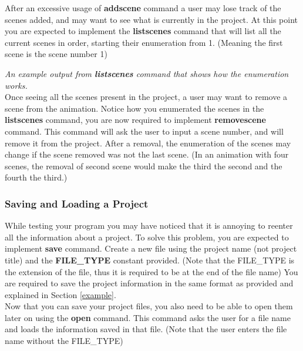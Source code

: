 \documentclass[a4paper]{article}
\begin{document}
	After an excessive usage of \textbf{addscene} command a user may lose track of the scenes added, and may want to see what is currently in the project. At this point you are expected to implement the \textbf{listscenes} command that will list all the current scenes in order, starting their enumeration from 1. (Meaning the first scene is the scene number 1) \\
	
	\begin{center}
	\end{center}
	\emph{An example output from \textbf{listscenes} command that shows how the enumeration works.}\\
	
	Once seeing all the scenes present in the project, a user may want to remove a scene from the animation. Notice how you enumerated the scenes in the \textbf{listscenes} command, you are now required to implement \textbf{removescene} command. This command will ask the user to input a scene number, and will remove it from the project. After a removal, the enumeration of the scenes may change if the scene removed was not the last scene. (In an animation with four scenes, the removal of second scene would make the third the second and the fourth the third.) 
	
	\subsubsection{Saving and Loading a Project}

	While testing your program you may have noticed that it is annoying to reenter all the information about a project. To solve this problem, you are expected to implement \textbf{save} command. Create a new file using the project name (not project title) and the \textbf{FILE\_TYPE} constant provided. (Note that the FILE\_TYPE is the extension of the file, thus it is required to be at the end of the file name) You are required to save the project information in the same format as provided and explained in Section \ref{example}. \\
	
	Now that you can save your project files, you also need to be able to open them later on using the \textbf{open} command. This command asks the user for a file name and loads the information saved in that file. (Note that the user enters the file name without the FILE\_TYPE) \\
	
\end{document}
